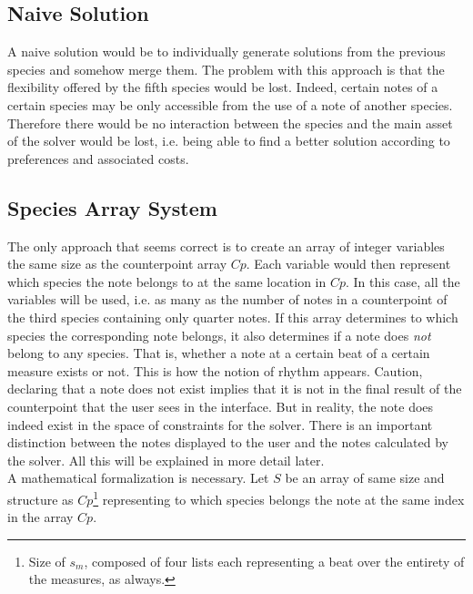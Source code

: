 \subsection{Naive Solution}
A naive solution would be to individually generate solutions from the previous species and somehow merge them. The problem with this approach is that the flexibility offered by the fifth species would be lost. Indeed, certain notes of a certain species may be only accessible from the use of a note of another species. Therefore there would be no interaction between the species and the main asset of the solver would be lost, i.e. being able to find a better solution according to preferences and associated costs.

\subsection{Species Array System}
The only approach that seems correct is to create an array of integer variables the same size as the counterpoint array $Cp$. Each variable would then represent which species the note belongs to at the same location in $Cp$. In this case, all the variables will be used, i.e. as many as the number of notes in a counterpoint of the third species containing only quarter notes. If this array determines to which species the corresponding note belongs, it also determines if a note does \emph{not} belong to any species. That is, whether a note at a certain beat of a certain measure exists or not. This is how the notion of rhythm appears. Caution, declaring that a note does not exist implies that it is not in the final result of the counterpoint that the user sees in the interface. But in reality, the note does indeed exist in the space of constraints for the solver. There is an important distinction between the notes displayed to the user and the notes calculated by the solver. All this will be explained in more detail later.\\

A mathematical formalization is necessary. Let $S$ be an array of same size and structure as $Cp$\footnote{Size of $s_m$, composed of four lists each representing a beat over the entirety of the measures, as always.} representing to which species belongs the note at the same index in the array $Cp$.

